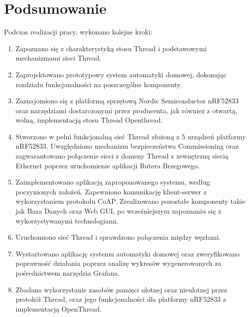 \section*{Podsumowanie}

Podczas realizacji pracy, wykonano kolejne kroki:
\begin{enumerate}
    \item Zapoznano się z charakterystyką stosu Thread i podstawowymi mechanizmami sieci Thread.
    \item Zaprojektowano prototypowy system automatyki domowej, dokonując rozdziału funkcjonalności na poszczególne komponenty.
    \item Zaznajomiono się z platformą sprzętową Nordic Semiconductor nRF52833 oraz narzędziami dostarczonymi przez producenta, jak również z otwartą, wolną, implementacją stosu Thread Openthread.
    \item Stworzono w pełni funkcjonalną sieć Thread złożoną z 5 urządzeń platformy nRF52833. Uwzględniono mechanizm bezpieczeństwa Commissioning oraz zagwarantowano połączenie sieci z domeny Thread z zewnętrzną siecią Ethernet poprzez uruchomienie aplikacji Rutera Brzegowego.
    \item Zaimplementowano aplikacją zaproponowanego systemu, według poczynionych założeń. Zapewniono komunikację klient-serwer z wykorzystaniem protokołu CoAP. Zrealizowano pozostałe komponenty takie jak Baza Danych oraz Web GUI, po wcześniejszym zapoznaniu się z wykorzystywanymi technologiami.
    \item Uruchomiono sieć Thread i sprawdzono połączenia między węzłami.
    \item Wystartowano aplikację systemu automatyki domowej oraz zweryfikowano poprawność działania poprzez analizę wykresów wygenerowanych za pośrednictwem narzędzia Grafana.
    \item Zbadano wykorzystanie zasobów pamięci ulotnej oraz nieulotnej przez protokół Thread, oraz jego funkcjonalności dla platformy nRF52833 z implementacją OpenThread.
\end{enumerate}

